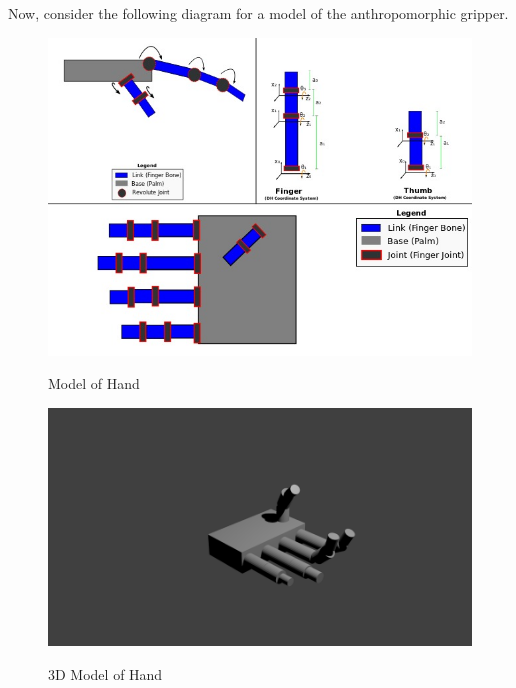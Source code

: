 \documentclass[12pt]{article}
\begin{document}
Now, consider the following diagram for a model of the anthropomorphic gripper.\cite{model}
\begin{figure}[h!]
\caption{Model of Hand}
\includegraphics[scale=0.5]{img/hand_diagram.jpg}
\label{fig:diagram}
\centering
\end{figure}
\vspace{20pt}
\begin{figure}[h!]
\caption{3D Model of Hand}
\includegraphics[scale=0.21]{img/3dhand.png}
\label{fig:3d}
\centering
\end{figure}
\end{document}
